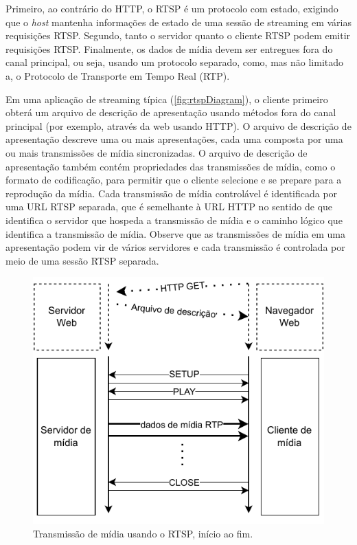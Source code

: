 \documentclass[12pt, %
openright, 
oneside, %
a4paper,    %
brazil]{facom-ufu-abntex2}
\begin{document}
Primeiro, ao contrário do HTTP, o RTSP é um protocolo com estado, exigindo que
o \textit{host} mantenha informações de estado de uma sessão de streaming em
várias requisições RTSP. Segundo, tanto o servidor quanto o cliente RTSP podem
emitir requisições RTSP. Finalmente, os dados de mídia devem ser entregues fora
do canal principal, ou seja, usando um protocolo separado, como, mas não
limitado a, o Protocolo de Transporte em Tempo Real (RTP).

Em uma aplicação de streaming típica (\autoref{fig:rtspDiagram}), o cliente
primeiro obterá um arquivo de descrição de apresentação usando métodos fora do
canal principal (por exemplo, através da web usando HTTP). O arquivo de
descrição de apresentação descreve uma ou mais apresentações, cada uma composta
por uma ou mais transmissões de mídia sincronizadas. O arquivo de descrição de
apresentação também contém propriedades das transmissões de mídia, como o
formato de codificação, para permitir que o cliente selecione e se prepare para
a reprodução da mídia. Cada transmissão de mídia controlável é identificada por
uma URL RTSP separada, que é semelhante à URL HTTP no sentido de que identifica
o servidor que hospeda a transmissão de mídia e o caminho lógico que identifica
a transmissão de mídia. Observe que as transmissões de mídia em uma
apresentação podem vir de vários servidores e cada transmissão é controlada por
meio de uma sessão RTSP separada. \cite{rfc2326}

\begin{figure}[!ht]
	\centering
	\includegraphics[width=0.8\linewidth]{rtsp.pdf}
	\caption[Diagrama RTSP]{Transmissão de mídia usando o RTSP, início ao
		fim.}
	\label{fig:rtspDiagram}
\end{figure}
\end{document}

